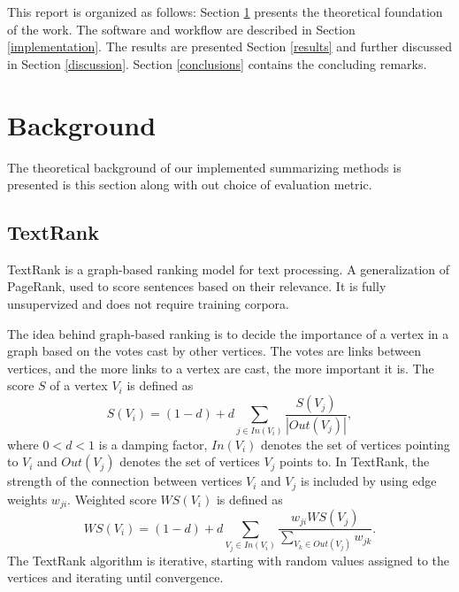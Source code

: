 \documentclass[conference]{IEEEtran}
\begin{document}
This report is organized as follows: Section \ref{background} presents the theoretical foundation of the work. 
The software and workflow are described in Section \ref{implementation}. The results are presented Section \ref{results} and further discussed in Section \ref{discussion}. Section \ref{conclusions} contains the concluding remarks.

\section{Background}\label{background}
The theoretical background of our implemented summarizing methods is presented is this section along with out choice of evaluation metric. 

\subsection{TextRank}
TextRank \cite{mihalcea2004} is a graph-based ranking model for text processing. A generalization of PageRank, used to score sentences based on their relevance. It is fully unsupervized and does not require training corpora. 

The idea behind graph-based ranking is to decide the importance of a vertex in a graph based on the votes cast by other vertices. The votes are links between vertices, and the more links to a vertex are cast, the more important it is. The score $S$ of a vertex $V_i$ is defined as \cite{brin1998}
\begin{equation}
S(V_i) = (1-d)+d \sum \limits_{j \in In(V_i)} \frac{S(V_j)}{|Out(V_j)|},
\end{equation}
where $0 < d < 1$ is a damping factor, $In(V_i)$ denotes the set of vertices pointing to $V_i$ and $Out(V_j)$ denotes the set of vertices $V_j$ points to. In TextRank, the strength of the connection between vertices $V_i$ and $V_j$ is included by using edge weights $w_{ji}$. Weighted score $WS(V_i)$ is defined as
\begin{equation}
WS(V_i) = (1-d) + d \sum \limits_{V_j \in In(V_i)} \frac{w_{ji} WS(V_j)}{\sum \limits_{V_k \in Out(V_j)}w_{jk}}.
\end{equation}
The TextRank algorithm is iterative, starting with random values assigned to the vertices and iterating until convergence.
\end{document}
